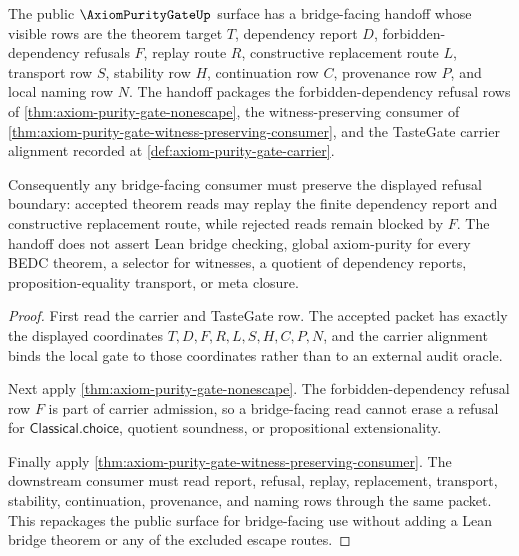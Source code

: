 \begin{theorem}
\label{thm:axiom-purity-gate-bridged-handoff}
The public $\AxiomPurityGateUp$ surface has a bridge-facing handoff whose
visible rows are the theorem target $T$, dependency report $D$,
forbidden-dependency refusals $F$, replay route $R$, constructive replacement
route $L$, transport row $S$, stability row $H$, continuation row $C$,
provenance row $P$, and local naming row $N$. The handoff packages the
forbidden-dependency refusal rows of
\autoref{thm:axiom-purity-gate-nonescape}, the witness-preserving consumer of
\autoref{thm:axiom-purity-gate-witness-preserving-consumer}, and the
TasteGate carrier alignment recorded at
\autoref{def:axiom-purity-gate-carrier}.

Consequently any bridge-facing consumer must preserve the displayed refusal
boundary: accepted theorem reads may replay the finite dependency report and
constructive replacement route, while rejected reads remain blocked by $F$.
The handoff does not assert Lean bridge checking, global axiom-purity for every
BEDC theorem, a selector for witnesses, a quotient of dependency reports,
proposition-equality transport, or meta closure.
\end{theorem}
\begin{proof}
First read the carrier and TasteGate row. The accepted packet has exactly the
displayed coordinates $T,D,F,R,L,S,H,C,P,N$, and the carrier alignment binds
the local gate to those coordinates rather than to an external audit oracle.

Next apply \autoref{thm:axiom-purity-gate-nonescape}. The forbidden-dependency
refusal row $F$ is part of carrier admission, so a bridge-facing read cannot
erase a refusal for $\mathsf{Classical.choice}$, quotient soundness, or
propositional extensionality.

Finally apply \autoref{thm:axiom-purity-gate-witness-preserving-consumer}.
The downstream consumer must read report, refusal, replay, replacement,
transport, stability, continuation, provenance, and naming rows through the
same packet. This repackages the public surface for bridge-facing use without
adding a Lean bridge theorem or any of the excluded escape routes.
\end{proof}


